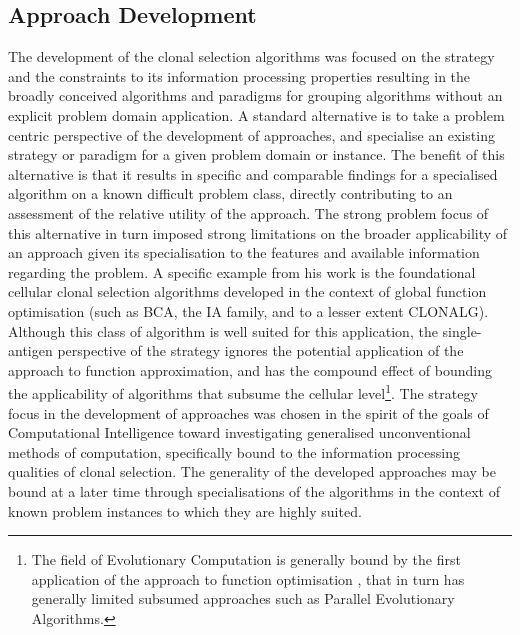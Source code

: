 \subsection{Approach Development}
The development of the clonal selection algorithms was focused on the strategy and the constraints to its information processing properties resulting in the broadly conceived algorithms and paradigms for grouping algorithms without an explicit problem domain application.
A standard alternative is to take a problem centric perspective of the development of approaches, and specialise an existing strategy or paradigm for a given problem domain or instance.
The benefit of this alternative is that it results in specific and comparable findings for a specialised algorithm on a known difficult problem class, directly contributing to an assessment of the relative utility of the approach. The strong problem focus of this alternative in turn imposed strong limitations on the broader applicability of an approach given its specialisation to the features and available information regarding the problem.
A specific example from his work is the foundational cellular clonal selection algorithms developed in the context of global function optimisation (such as BCA, the IA family, and to a lesser extent CLONALG). Although this class of algorithm is well suited for this application, the single-antigen perspective of the strategy ignores the potential application of the approach to function approximation, and has the compound effect of bounding the applicability of algorithms that subsume the cellular level\footnote{The field of Evolutionary Computation is generally bound by the first application of the approach to function optimisation \cite{Jong1992}, that in turn has generally limited subsumed approaches such as Parallel Evolutionary Algorithms.}.
The strategy focus in the development of approaches was chosen in the spirit of the goals of Computational Intelligence toward investigating generalised unconventional methods of computation, specifically bound to the information processing qualities of clonal selection. The generality of the developed approaches may be bound at a later time through specialisations of the algorithms in the context of known problem instances to which they are highly suited.

%
%
